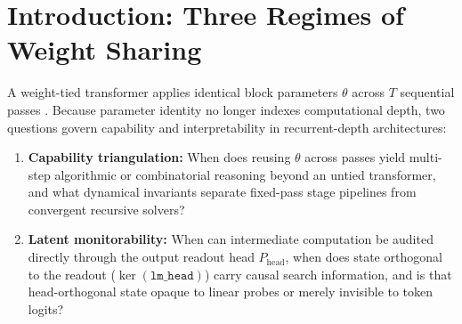 \documentclass[10pt,letterpaper]{article}
\newcommand{\Phead}{P_{\mathrm{head}}}
\begin{document}
\begin{abstract}
$\times$ 21 core calls $= 336$ passes) solves $88.3\%$ ($226/256$) of \texttt{items256} and $100\%$ ($100/100$) of \texttt{bench100} ($92/100 = 92.0\%$ on an independent replication checkpoint), including $51/51$ (\texttt{bench100}) and $153/183 = 83.6\%$ (\texttt{items256}) whole-board deductively stalled puzzles. Visible beliefs commute with exact propagation before stall ($\mathrm{AUC}=1.000$). While naive unnormalized projection onto the 11-d \texttt{lm\_head} row space collapses solve ($1.000 \to 0.050$--$0.070$) via off-manifold norm loss, restoring per-cell L2 norm, train-mean offset, or donor fibers preserves $100\%$ ($73/73$) of propagation-solvable boards and $74.9\%$--$76.0\%$ of stalled \texttt{items256} boards via continuous $81\times 11$ logit fields, isolating a selective $-7.7$ to $-8.7$~pp deficit on stalled boards ($p \le 0.0043$; $-15.6$~pp on round-0 stalled \texttt{S4}, $-21.9$~pp under step-1 fiber freeze, $p=1.08\times 10^{-6}$) that recovers completely with the top $k=64$ orthogonal PCA directions ($p=1.00$) and remains linearly probe-decodable ($97.1\%$--$97.8\%$ step-1 candidate masks; $93.5\%$--$100\%$ step-16 digits).
\end{abstract}

\section{Introduction: Three Regimes of Weight Sharing}\label{sec:intro}

A weight-tied transformer applies identical block parameters $\theta$ across $T$ sequential passes \cite{dehghani2019universal,giannou2023looped,saunshi2025latent,geiping2025huginn,jolicoeur2025trm}. Because parameter identity no longer indexes computational depth, two questions govern capability and interpretability in recurrent-depth architectures:
\begin{enumerate}[topsep=3pt,itemsep=2pt]
  \item \textbf{Capability triangulation:} When does reusing $\theta$ across passes yield multi-step algorithmic or combinatorial reasoning beyond an untied transformer, and what dynamical invariants separate fixed-pass stage pipelines from convergent recursive solvers?
  \item \textbf{Latent monitorability:} When can intermediate computation be audited directly through the output readout head $\Phead$, when does state orthogonal to the readout ($\ker(\texttt{lm\_head})$) carry causal search information, and is that head-orthogonal state opaque to linear probes or merely invisible to token logits?
\end{enumerate}
\end{document}
